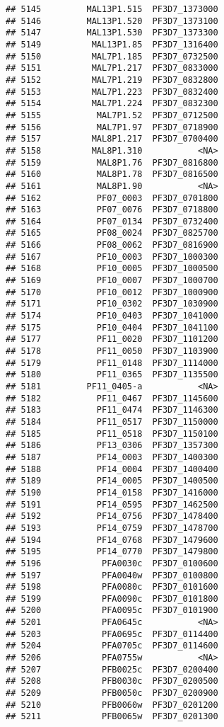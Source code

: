 \documentclass{article}\usepackage[]{graphicx}\usepackage[]{color}
\makeatletter
\newenvironment{kframe}{%
 \def\at@end@of@kframe{}%
 \ifinner\ifhmode%
  \def\at@end@of@kframe{\end{minipage}}%
  \begin{minipage}{\columnwidth}%
 \fi\fi%
 \def\FrameCommand##1{\hskip\@totalleftmargin \hskip-\fboxsep
 \colorbox{shadecolor}{##1}\hskip-\fboxsep
     \hskip-\linewidth \hskip-\@totalleftmargin \hskip\columnwidth}%
 \MakeFramed {\advance\hsize-\width
   \@totalleftmargin\z@ \linewidth\hsize
   \@setminipage}}%
 {\par\unskip\endMakeFramed%
 \at@end@of@kframe}
\newenvironment{knitrout}{}{} %
\makeatother
\begin{document}
\begin{knitrout}
\begin{kframe}
\begin{verbatim}
## 5145         MAL13P1.515  PF3D7_1373000
## 5146         MAL13P1.520  PF3D7_1373100
## 5147         MAL13P1.530  PF3D7_1373300
## 5149          MAL13P1.85  PF3D7_1316400
## 5150          MAL7P1.185  PF3D7_0732500
## 5151          MAL7P1.217  PF3D7_0833000
## 5152          MAL7P1.219  PF3D7_0832800
## 5153          MAL7P1.223  PF3D7_0832400
## 5154          MAL7P1.224  PF3D7_0832300
## 5155           MAL7P1.52  PF3D7_0712500
## 5156           MAL7P1.97  PF3D7_0718900
## 5157          MAL8P1.217  PF3D7_0700400
## 5158          MAL8P1.310           <NA>
## 5159           MAL8P1.76  PF3D7_0816800
## 5160           MAL8P1.78  PF3D7_0816500
## 5161           MAL8P1.90           <NA>
## 5162           PF07_0003  PF3D7_0701800
## 5163           PF07_0076  PF3D7_0718800
## 5164           PF07_0134  PF3D7_0732400
## 5165           PF08_0024  PF3D7_0825700
## 5166           PF08_0062  PF3D7_0816900
## 5167           PF10_0003  PF3D7_1000300
## 5168           PF10_0005  PF3D7_1000500
## 5169           PF10_0007  PF3D7_1000700
## 5170           PF10_0012  PF3D7_1000900
## 5171           PF10_0302  PF3D7_1030900
## 5174           PF10_0403  PF3D7_1041000
## 5175           PF10_0404  PF3D7_1041100
## 5177           PF11_0020  PF3D7_1101200
## 5178           PF11_0050  PF3D7_1103900
## 5179           PF11_0148  PF3D7_1114000
## 5180           PF11_0365  PF3D7_1135500
## 5181         PF11_0405-a           <NA>
## 5182           PF11_0467  PF3D7_1145600
## 5183           PF11_0474  PF3D7_1146300
## 5184           PF11_0517  PF3D7_1150000
## 5185           PF11_0518  PF3D7_1150100
## 5186           PF13_0306  PF3D7_1357300
## 5187           PF14_0003  PF3D7_1400300
## 5188           PF14_0004  PF3D7_1400400
## 5189           PF14_0005  PF3D7_1400500
## 5190           PF14_0158  PF3D7_1416000
## 5191           PF14_0595  PF3D7_1462500
## 5192           PF14_0756  PF3D7_1478400
## 5193           PF14_0759  PF3D7_1478700
## 5194           PF14_0768  PF3D7_1479600
## 5195           PF14_0770  PF3D7_1479800
## 5196            PFA0030c  PF3D7_0100600
## 5197            PFA0040w  PF3D7_0100800
## 5198            PFA0080c  PF3D7_0101600
## 5199            PFA0090c  PF3D7_0101800
## 5200            PFA0095c  PF3D7_0101900
## 5201            PFA0645c           <NA>
## 5203            PFA0695c  PF3D7_0114400
## 5204            PFA0705c  PF3D7_0114600
## 5206            PFA0755w           <NA>
## 5207            PFB0025c  PF3D7_0200400
## 5208            PFB0030c  PF3D7_0200500
## 5209            PFB0050c  PF3D7_0200900
## 5210            PFB0060w  PF3D7_0201200
## 5211            PFB0065w  PF3D7_0201300

\end{verbatim}
\end{kframe}
\end{knitrout}
\end{document}
